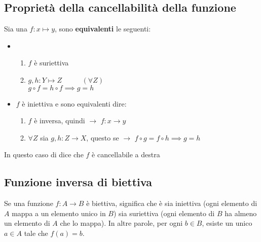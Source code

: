 \documentclass[article,12pt]{book}
\begin{document}
\begin{enumerate}
{\subsection{Proprietà della cancellabilità della funzione}
Sia una $f : x \mapsto y$, sono \textbf{equivalenti} le seguenti:
\begin{itemize}
    \item \begin{enumerate}
        \item $f$ è suriettiva
        \item $g,h : Y \mapsto Z$ \ \ \ \ \ $(\forall Z)$ \\
        $g \circ f = h \circ f \implies g = h$
    \end{enumerate}
    \item $f$ è iniettiva e sono equivalenti dire:
    \begin{enumerate}
        \item $f$ è inversa, quindi $\rightarrow$ $f : x \rightarrow y $
        \item $\forall Z$ sia $g,h : Z \rightarrow X$, questo se $\rightarrow$ $f \circ g = f \circ h \implies g = h$
    \end{enumerate}
\end{itemize}
    \begin{center}
    \end{center}
In questo caso di dice che $f$ è cancellabile a destra

\newpage
\subsection{Funzione inversa di biettiva}
Se una funzione \( f: A \rightarrow B \) è biettiva, significa che è sia iniettiva (ogni elemento di \( A \) mappa a un elemento unico in \( B \)) sia suriettiva (ogni elemento di \( B \) ha almeno un elemento di \( A \) che lo mappa). In altre parole, per ogni \( b \in B \), esiste un unico \( a \in A \) tale che \( f(a) = b \).

}
\end{enumerate}
\end{document}
